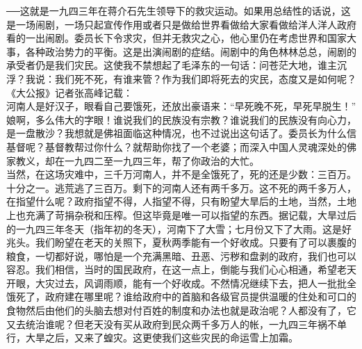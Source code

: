 {\Add ──}这就是一九四三年在蒋介石先生领导下的救灾运动。如果用总结性的话说，这是一场闹剧，一场只起宣传作用或者只是做给世界看做给大家看做给洋人洋人政府看的一出闹剧。委员长下令求灾，但并无救灾之心，他心里仍在考虑世界和国家大事，各种政治势力的平衡。这是出演闹剧的症结。闹剧中的角色林林总总，闹剧的承受者仍是我们灾民。这使我不禁想起了毛泽东的一句话：问苍茫大地，谁主沉浮？我说：我们死不死，有谁来管？作为我们即将死去的灾民，态度又是如何呢？《大公报》记者张高峰记载：\\

河南人是好汉子，眼看自己要饿死，还放出豪语来：“早死晚不死，早死早脱生！”\\

娘啊，多么伟大的字眼！谁说我们的民族没有宗教？谁说我们的民族没有向心力，是一盘散沙？我想就是佛祖面临这种情况，也不过说出这句话了。委员长为什么信基督呢？基督教帮过你什么？就帮助你找了一个老婆；而深入中国人灵魂深处的佛家教义，却在一九四二至一九四三年，帮了你政治的大忙。\\

当然，在这场灾难中，三千万河南人，并不是全饿死了，死的还是少数：三百万。十分之一。逃荒逃了三百万。剩下的河南人还有两千多万。这不死的两千多万人，在指望什么呢？政府指望不得，人指望不得，只有盼望大旱后的土地，当然，土地上也充满了苛捐杂税和压榨。但这毕竟是唯一可以指望的东西。据记载，大旱过后的一九四三年冬天（指年初的冬天），河南下了大雪；七月份又下了大雨。这是好兆头。我们盼望在老天的关照下，夏秋两季能有一个好收成。只要有了可以裹腹的粮食，一切都好说，哪怕是一个充满黑暗、丑恶、污秽和盘剥的政府，我们也可以容忍。我们相信，当时的国民政府，在这一点上，倒能与我们心心相通，希望老天开眼，大灾过去，风调雨顺，能有一个好收成。不然情况继续下去，把人一批批全饿死了，政府建在哪里呢？谁给政府中的首脑和各级官员提供温暖的住处和可口的食物然后由他们的头脑去想对付百姓的制度和办法也就是政治呢？人都没有了，它又去统治谁呢？但老天没有买从政府到民众两千多万人的帐，一九四三年祸不单行，大旱之后，又来了蝗灾。这更使我们这些灾民的命运雪上加霜。\\
